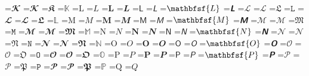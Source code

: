 \documentclass{article}
\begin{document}
=\hbox{$\mathbfcal{K}$}
=\hbox{$\mathbfscr{K}$}
=\hbox{$\mathbffrak{K}$}
=\hbox{$\mathbb{K}$}
=\hbox{$\mathrm{L}$}
=\hbox{$\mathit{L}$}
=\hbox{$\mathbf{L}$}
=\hbox{$\mathbfit{L}$}
=\hbox{$\mathsf{L}$}
=\hbox{$\mathsfit{L}$}
=\hbox{$\mathbfsf{L}$}
=\hbox{$\mathbfsfit{L}$}
=\hbox{$\mathcal{L}$}
=\hbox{$\mathscr{L}$}
=\hbox{$\mathfrak{L}$}
=\hbox{$\mathtt{L}$}
=\hbox{$\mathbfcal{L}$}
=\hbox{$\mathbfscr{L}$}
=\hbox{$\mathbffrak{L}$}
=\hbox{$\mathbb{L}$}
=\hbox{$\mathrm{M}$}
=\hbox{$\mathit{M}$}
=\hbox{$\mathbf{M}$}
=\hbox{$\mathbfit{M}$}
=\hbox{$\mathsf{M}$}
=\hbox{$\mathsfit{M}$}
=\hbox{$\mathbfsf{M}$}
=\hbox{$\mathbfsfit{M}$}
=\hbox{$\mathcal{M}$}
=\hbox{$\mathscr{M}$}
=\hbox{$\mathfrak{M}$}
=\hbox{$\mathtt{M}$}
=\hbox{$\mathbfcal{M}$}
=\hbox{$\mathbfscr{M}$}
=\hbox{$\mathbffrak{M}$}
=\hbox{$\mathbb{M}$}
=\hbox{$\mathrm{N}$}
=\hbox{$\mathit{N}$}
=\hbox{$\mathbf{N}$}
=\hbox{$\mathbfit{N}$}
=\hbox{$\mathsf{N}$}
=\hbox{$\mathsfit{N}$}
=\hbox{$\mathbfsf{N}$}
=\hbox{$\mathbfsfit{N}$}
=\hbox{$\mathcal{N}$}
=\hbox{$\mathscr{N}$}
=\hbox{$\mathfrak{N}$}
=\hbox{$\mathtt{N}$}
=\hbox{$\mathbfcal{N}$}
=\hbox{$\mathbfscr{N}$}
=\hbox{$\mathbffrak{N}$}
=\hbox{$\mathbb{N}$}
=\hbox{$\mathrm{O}$}
=\hbox{$\mathit{O}$}
=\hbox{$\mathbf{O}$}
=\hbox{$\mathbfit{O}$}
=\hbox{$\mathsf{O}$}
=\hbox{$\mathsfit{O}$}
=\hbox{$\mathbfsf{O}$}
=\hbox{$\mathbfsfit{O}$}
=\hbox{$\mathcal{O}$}
=\hbox{$\mathscr{O}$}
=\hbox{$\mathfrak{O}$}
=\hbox{$\mathtt{O}$}
=\hbox{$\mathbfcal{O}$}
=\hbox{$\mathbfscr{O}$}
=\hbox{$\mathbffrak{O}$}
=\hbox{$\mathbb{O}$}
=\hbox{$\mathrm{P}$}
=\hbox{$\mathit{P}$}
=\hbox{$\mathbf{P}$}
=\hbox{$\mathbfit{P}$}
=\hbox{$\mathsf{P}$}
=\hbox{$\mathsfit{P}$}
=\hbox{$\mathbfsf{P}$}
=\hbox{$\mathbfsfit{P}$}
=\hbox{$\mathcal{P}$}
=\hbox{$\mathscr{P}$}
=\hbox{$\mathfrak{P}$}
=\hbox{$\mathtt{P}$}
=\hbox{$\mathbfcal{P}$}
=\hbox{$\mathbfscr{P}$}
=\hbox{$\mathbffrak{P}$}
=\hbox{$\mathbb{P}$}
=\hbox{$\mathrm{Q}$}
=\hbox{$\mathit{Q}$}
\end{document}
